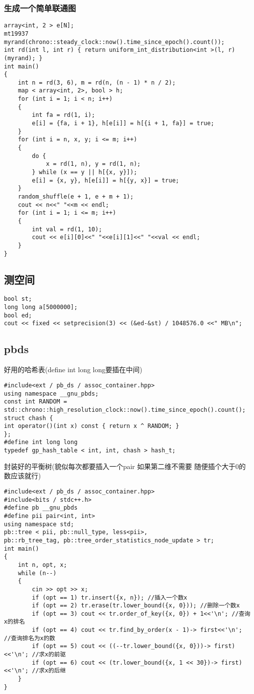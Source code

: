 \documentclass[a4paper, fontset=none]{ctexart}
\begin{document}
\subsubsection{生成一个简单联通图}

\begin{verbatim}
array<int, 2 > e[N];
mt19937 myrand(chrono::steady_clock::now().time_since_epoch().count());
int rd(int l, int r) { return uniform_int_distribution<int >(l, r)(myrand); }
int main()
{
    int n = rd(3, 6), m = rd(n, (n - 1) * n / 2);
    map < array<int, 2>, bool > h;
    for (int i = 1; i < n; i++)
    {
        int fa = rd(1, i);
        e[i] = {fa, i + 1}, h[e[i]] = h[{i + 1, fa}] = true;
    }
    for (int i = n, x, y; i <= m; i++)
    {
        do {
            x = rd(1, n), y = rd(1, n);
        } while (x == y || h[{x, y}]);
        e[i] = {x, y}, h[e[i]] = h[{y, x}] = true;
    }
    random_shuffle(e + 1, e + m + 1);
    cout << n<<" "<<m << endl;
    for (int i = 1; i <= m; i++)
    {
        int val = rd(1, 10);
        cout << e[i][0]<<" "<<e[i][1]<<" "<<val << endl;
    }
}
\end{verbatim}
\subsection{测空间}

\begin{verbatim}
bool st;
long long a[5000000];
bool ed;
cout << fixed << setprecision(3) << (&ed-&st) / 1048576.0 <<" MB\n";
\end{verbatim}
\subsection{pbds}
好用的哈希表(define int long long要插在中间)
\begin{verbatim}
#include<ext / pb_ds / assoc_container.hpp>
using namespace __gnu_pbds;
const int RANDOM = std::chrono::high_resolution_clock::now().time_since_epoch().count();
struct chash {
int operator()(int x) const { return x ^ RANDOM; }
};
#define int long long
typedef gp_hash_table < int, int, chash > hash_t;
\end{verbatim}

封装好的平衡树(貌似每次都要插入一个pair 如果第二维不需要 随便插个大于0的数应该就行)

\begin{verbatim}
#include<ext / pb_ds / assoc_container.hpp>
#include<bits / stdc++.h>
#define pb __gnu_pbds
#define pii pair<int, int>
using namespace std;
pb::tree < pii, pb::null_type, less<pii>,
pb::rb_tree_tag, pb::tree_order_statistics_node_update > tr;
int main()
{
    int n, opt, x;
    while (n--)
    {
        cin >> opt >> x;
        if (opt == 1) tr.insert({x, n}); //插入一个数x
        if (opt == 2) tr.erase(tr.lower_bound({x, 0})); //删除一个数x
        if (opt == 3) cout << tr.order_of_key({x, 0}) + 1<<'\n'; //查询x的排名
        if (opt == 4) cout << tr.find_by_order(x - 1)-> first<<'\n'; //查询排名为x的数
        if (opt == 5) cout << ((--tr.lower_bound({x, 0}))-> first)<<'\n'; //求x的前驱
        if (opt == 6) cout << (tr.lower_bound({x, 1 << 30})-> first)<<'\n'; //求x的后继
    }
}
\end{verbatim}
\end{document}
